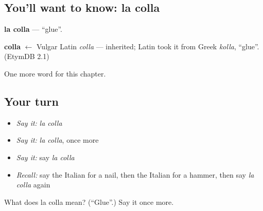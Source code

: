 \subsection*{You'll want to know: la colla}
\textbf{la colla} — \textquotedblleft{}glue\textquotedblright{}.

\begin{cousinweb}
\textbf{colla} $\leftarrow$ Vulgar Latin \emph{colla} — inherited; Latin took it from Greek \emph{kolla}, \textquotedblleft{}glue\textquotedblright{}. (EtymDB 2.1)
\end{cousinweb}

\begin{grammarlens}[title={What you've built}]
One more word for this chapter.
\end{grammarlens}

\subsection*{Your turn}
\begin{itemize}
\raggedright
  \item \emph{Say it:} \emph{la colla}
  \item \emph{Say it:} \emph{la colla}, once more
  \item \emph{Say it:} say \emph{la colla}
  \item \emph{Recall:} say the Italian for a nail, then the Italian for a hammer, then say \emph{la colla} again
\end{itemize}

\begin{tcolorbox}[breakable,colback=teal!4,colframe=teal!35!black,title={Before you move on}]
What does la colla mean? (\textquotedblleft{}Glue\textquotedblright{}.) Say it once more.
\end{tcolorbox}
